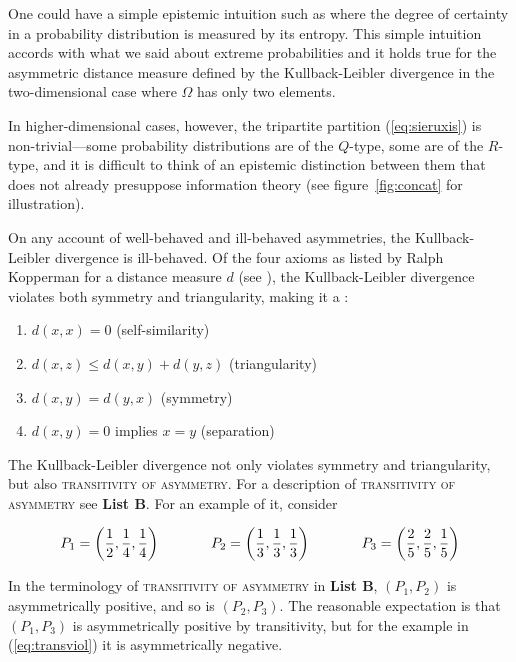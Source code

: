 \documentclass[12pt]{article}
\begin{document}
One could have a simple epistemic intuition such as 
where the degree of certainty in a probability distribution is
measured by its entropy. This simple intuition accords with what we
said about extreme probabilities and it holds true for the asymmetric
distance measure defined by the Kullback-Leibler divergence in the
two-dimensional case where $\Omega$ has only two elements.

In higher-dimensional cases, however, the tripartite partition
(\ref{eq:sieruxis}) is non-trivial---some probability distributions
are of the $Q$-type, some are of the $R$-type, and it is difficult to
think of an epistemic distinction between them that does not already
presuppose information theory (see figure~\ref{fig:concat} for
illustration).

On any account of well-behaved and ill-behaved asymmetries, the
Kullback-Leibler divergence is ill-behaved. Of the four axioms as
listed by Ralph Kopperman for a distance measure $d$ (see
), the Kullback-Leibler divergence violates
both symmetry and triangularity, making it a :

\begin{enumerate}[(m1)]
\item $d(x,x)=0$ (self-similarity)
\item $d(x,z)\leq{}d(x,y)+d(y,z)$ (triangularity)
\item $d(x,y)=d(y,x)$ (symmetry)
\item $d(x,y)=0$ implies $x=y$ (separation)
\end{enumerate}

The Kullback-Leibler divergence not only violates symmetry and
triangularity, but also \textsc{transitivity of asymmetry}. For a
description of \textsc{transitivity of asymmetry} see \textbf{List B}.
For an example of it, consider

\begin{equation}
  \label{eq:transviol}
    P_{1}=\left(\frac{1}{2},\frac{1}{4},\frac{1}{4}\right)  \hspace{.5in}
    P_{2}=\left(\frac{1}{3},\frac{1}{3},\frac{1}{3}\right) \hspace{.5in}
    P_{3}=\left(\frac{2}{5},\frac{2}{5},\frac{1}{5}\right)
\end{equation}

In the terminology of \textsc{transitivity of asymmetry} in \textbf{List B},
$(P_{1},P_{2})$ is asymmetrically positive, and so is $(P_{2},P_{3})$.
The reasonable expectation is that $(P_{1},P_{3})$ is asymmetrically
positive by transitivity, but for the example in (\ref{eq:transviol})
it is asymmetrically negative.
\end{document}
